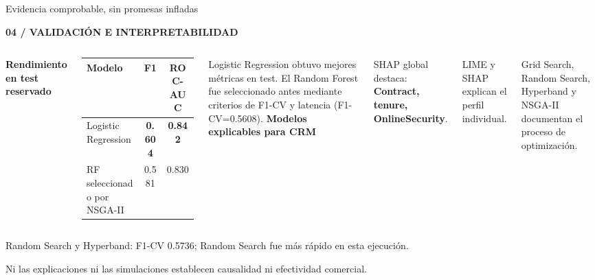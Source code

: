 \documentclass[aspectratio=169,10pt]{beamer}
\newcommand{\eyebrow}[1]{{\vspace{-.15cm}\scriptsize\bfseries\color{teal}\MakeUppercase{#1}\par\vspace{.18cm}}}
\begin{document}
\begin{frame}[t]{Evidencia comprobable, sin promesas infladas}
\eyebrow{04 / Validación e interpretabilidad}
\vspace{.03cm}
\begin{columns}[T,onlytextwidth]
{\small\bfseries Rendimiento en test reservado}\par\vspace{.08cm}
\begin{tabular}{@{}lcc@{}}\toprule
\small Modelo & \small F1 & \small ROC-AUC\\\midrule
\small Logistic Regression & \textbf{0.604} & \textbf{0.842}\\
\small RF seleccionado por NSGA-II & 0.581 & 0.830\\\bottomrule
\end{tabular}
\vspace{.17cm}
{\scriptsize\color{muted}Logistic Regression obtuvo mejores métricas en test. El Random Forest fue seleccionado antes mediante criterios de F1-CV y latencia (F1-CV=0.5608).}
{\small\bfseries Modelos explicables para CRM}\par\vspace{.09cm}
{\small SHAP global destaca: \textbf{Contract, tenure, OnlineSecurity}.}\par\vspace{.15cm}
{\small LIME y SHAP explican el perfil individual.}\par\vspace{.15cm}
{\small Grid Search, Random Search, Hyperband y NSGA-II documentan el proceso de optimización.}
\end{columns}
\vspace{.32cm}
\colorbox{light}{\parbox{.96\linewidth}{\vspace{.12cm}\scriptsize\color{muted}Random Search y Hyperband: F1-CV 0.5736; Random Search fue más rápido en esta ejecución.\par\vspace{.06cm}Ni las explicaciones ni las simulaciones establecen causalidad ni efectividad comercial.\vspace{.12cm}}}
\end{frame}
\end{document}
